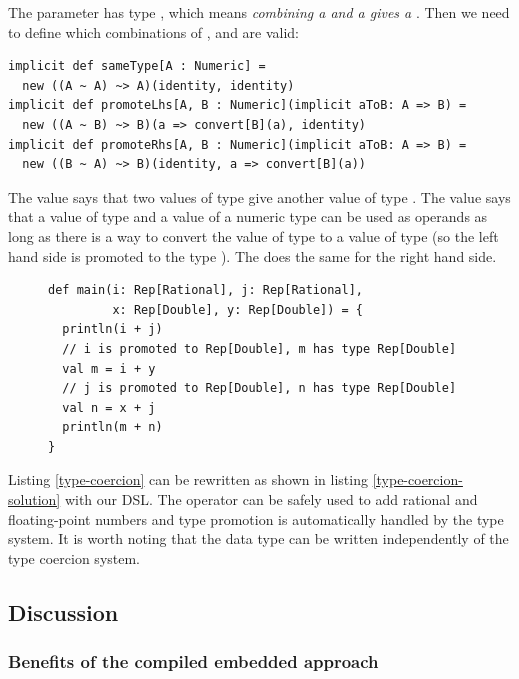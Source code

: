 \documentclass[american,english,runningheads]{llncs}
\begin{document}
The  parameter has type , which means \emph{combining a  and a  gives a
}. Then we need to define which combinations of ,  and  are valid:

\begin{lstlisting}[caption=Numeric operands constraints,label=type-coercion-constraints]
implicit def sameType[A : Numeric] =
  new ((A ~ A) ~> A)(identity, identity)
implicit def promoteLhs[A, B : Numeric](implicit aToB: A => B) =
  new ((A ~ B) ~> B)(a => convert[B](a), identity)
implicit def promoteRhs[A, B : Numeric](implicit aToB: A => B) =
  new ((B ~ A) ~> B)(identity, a => convert[B](a))
\end{lstlisting}

The  value says that two values of type  give another value of type . The
 value says that a value of type  and a value of a numeric type  can be used as
operands as long as there is a way to convert the value of type  to a value of type  (so the left
hand side is promoted to the type ). The  does the same for the right hand side.

\begin{figure}
\begin{lstlisting}[label=type-coercion-solution,caption=Type-coercion automatically handled by our DSL]
def main(i: Rep[Rational], j: Rep[Rational],
         x: Rep[Double], y: Rep[Double]) = {
  println(i + j)
  // i is promoted to Rep[Double], m has type Rep[Double]
  val m = i + y
  // j is promoted to Rep[Double], n has type Rep[Double]
  val n = x + j
  println(m + n)
}
\end{lstlisting}
\end{figure}

Listing \ref{type-coercion} can be rewritten as shown in listing \ref{type-coercion-solution} with our DSL.
The \code{+} operator can be safely used to add rational and floating-point numbers and type promotion is
automatically handled by the type system. It is worth noting that the  data type can be written
independently of the type coercion system.

\subsection{Discussion}

\subsubsection{Benefits of the compiled embedded approach}
\end{document}
